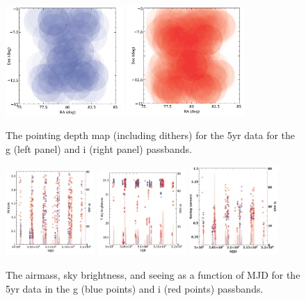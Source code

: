 \documentclass[prd, nofootinbib, floatfix, 11pt,tightenlines,times]{article}
\begin{document}
\begin{figure}
\centerline{
\includegraphics[width=0.4\textwidth]{Figures/depth_g.png}\hfil
\includegraphics[width=0.4\textwidth]{Figures/depth_i.png}
}
\caption{The pointing depth map (including dithers) for the 5yr data for the g (left panel)
 and i (right panel)  passbands.}
\label{depth}
\end{figure}


\begin{figure}
\centerline{
\includegraphics[width=0.3\textwidth]{Figures/airmass_mjd.png}\hfil
\includegraphics[width=0.3\textwidth]{Figures/sky_mjd.png}\hfil
\includegraphics[width=0.3\textwidth]{Figures/seeing.png}
}
\caption{The airmass, sky brightness, and seeing as a function of MJD for the
  5yr data in the g (blue points) and i (red points) passbands.}
\label{airmass}
\end{figure}
\end{document}
